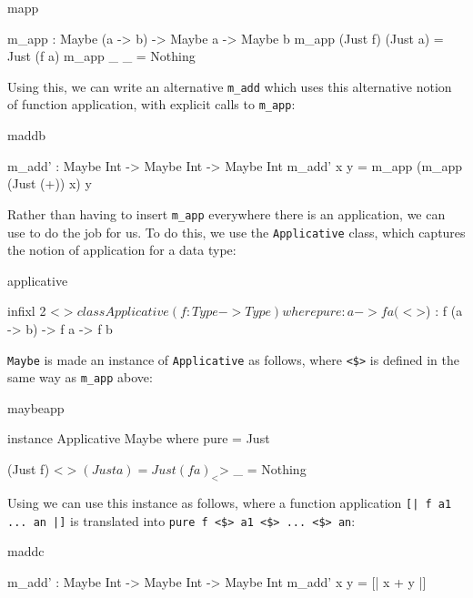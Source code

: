\begin{SaveVerbatim}{mapp}

m_app : Maybe (a -> b) -> Maybe a -> Maybe b
m_app (Just f) (Just a) = Just (f a)
m_app _        _        = Nothing

\end{SaveVerbatim}

\noindent
Using this, we can write an alternative \texttt{m\_add} which uses this alternative
notion of function application, with explicit calls to \texttt{m\_app}:

\begin{SaveVerbatim}{maddb}

m_add' : Maybe Int -> Maybe Int -> Maybe Int
m_add' x y = m_app (m_app (Just (+)) x) y

\end{SaveVerbatim}

\noindent
Rather than having to insert \texttt{m\_app} everywhere there is an
application, we can use  to do the job for us. To do
this, we use the \texttt{Applicative} class, which captures the notion of
application for a data type:

\begin{SaveVerbatim}{applicative}

infixl 2 <$> 

class Applicative (f : Type -> Type) where 
    pure  : a -> f a
    (<$>) : f (a -> b) -> f a -> f b 

\end{SaveVerbatim}

\noindent
\texttt{Maybe} is made an instance of \texttt{Applicative} as follows, where
\texttt{<\$>} is defined in the same way as \texttt{m\_app} above:

\begin{SaveVerbatim}{maybeapp}

instance Applicative Maybe where
    pure = Just

    (Just f) <$> (Just a) = Just (f a)
    _        <$> _        = Nothing

\end{SaveVerbatim}

\noindent
Using  we can use this instance as follows, where a function
application \texttt{[| f a1 ... an |]}
is translated into \texttt{pure f <\$> a1 <\$> ... <\$> an}:

\begin{SaveVerbatim}{maddc}

m_add' : Maybe Int -> Maybe Int -> Maybe Int
m_add' x y = [| x + y |]

\end{SaveVerbatim}


